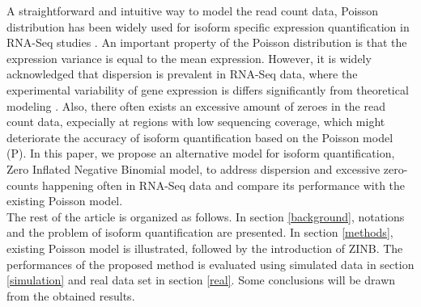 \documentclass[11pt]{article}
\begin{document}
\noindent A straightforward and intuitive way to model the read count data, Poisson distribution has been widely used for isoform specific expression quantification in RNA-Seq studies \cite{jiang2009statistical, hu2012using}. 
\noindent An important property of the Poisson distribution is that the expression variance is equal to the mean expression. However, it is widely acknowledged that dispersion is prevalent in RNA-Seq data, where the experimental variability of gene expression is differs significantly from theoretical modeling \cite{anders2010differential}. Also, there often exists an excessive amount of zeroes in the read count data, expecially at regions with low sequencing coverage, which might deteriorate the accuracy of isoform quantification based on the Poisson model (P). In this paper, we propose an alternative model for isoform quantification, Zero Inflated Negative Binomial model, to address dispersion and excessive zero-counts happening often in RNA-Seq data and compare its performance with the existing Poisson model. 
\\


\noindent The rest of the article is organized as follows. In section \ref{background}, notations and the problem of isoform quantification are presented. In section \ref{methods}, existing Poisson model is illustrated, followed by the introduction of ZINB. The performances of the proposed method is evaluated using simulated data in section \ref{simulation} and real data set in section \ref{real}. Some conclusions will be drawn from the obtained results.  
\end{document}
